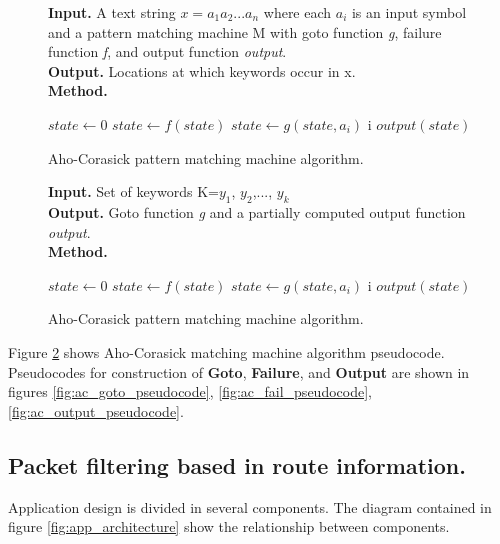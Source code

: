 \documentclass[thesis=M,english]{FITthesis}[2011/07/15]
\begin{document}
\begin{figure}
\textbf{Input.} A text string $x = a_1 a_2 ... a_n$ where each $a_i$ is an input symbol and a pattern matching machine M with goto function \emph{g}, failure function \emph{f}, and output function \emph{output}.\\
\textbf{Output.} Locations at which keywords occur in x.\\
\textbf{Method.}
\begin{algorithmic}
\STATE $state \leftarrow 0$
\STATE $state \leftarrow f(state)$
\ENDWHILE
\STATE $state \leftarrow g(state, a_i)$
\PRINT i
\PRINT $output(state)$
\ENDIF
\ENDFOR
\end{algorithmic}
\caption{Aho-Corasick pattern matching machine algorithm.}
\label{fig:ac_search_pseudocode}
\end{figure}

\begin{figure}
\textbf{Input.} Set of keywords K={$y_1$, $y_2$,..., $y_k$} \\
\textbf{Output.} Goto function \emph{g} and a partially computed output function \emph{output}.\\
\textbf{Method.}
\begin{algorithmic}
\STATE $state \leftarrow 0$
\STATE $state \leftarrow f(state)$
\ENDWHILE
\STATE $state \leftarrow g(state, a_i)$
\PRINT i
\PRINT $output(state)$
\ENDIF
\ENDFOR
\end{algorithmic}
\caption{Aho-Corasick pattern matching machine algorithm.}
\label{fig:ac_search_pseudocode}
\end{figure}

Figure \ref{fig:ac_search_pseudocode} shows Aho-Corasick matching machine algorithm pseudocode. Pseudocodes for construction of \textbf{Goto}, \textbf{Failure}, and \textbf{Output} are shown in figures \ref{fig:ac_goto_pseudocode}, \ref{fig:ac_fail_pseudocode}, \ref{fig:ac_output_pseudocode}.


\subsection*{Packet filtering based in route information.}


Application design is divided in several components. The diagram contained in figure \ref{fig:app_architecture} show the relationship between components.
\end{document}
